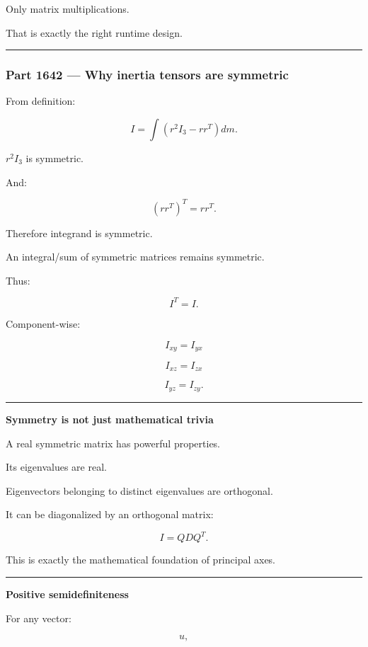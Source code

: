Only matrix multiplications.

That is exactly the right runtime design.

\begin{center}\rule{0.5\linewidth}{0.5pt}\end{center}

\subsubsection{Part 1642 --- Why inertia tensors are symmetric}\label{part-1642-why-inertia-tensors-are-symmetric}

From definition:

\[
I
=
\int
(
r^2I_3
-
rr^T
)
dm.
\]

\(r^2I_3\) is symmetric.

And:

\[
(rr^T)^T
=
rr^T.
\]

Therefore integrand is symmetric.

An integral/sum of symmetric matrices remains symmetric.

Thus:

\[
\boxed{
I^T=I.
}
\]

Component-wise:

\[
I_{xy}=I_{yx}
\]

\[
I_{xz}=I_{zx}
\]

\[
I_{yz}=I_{zy}.
\]

\begin{center}\rule{0.5\linewidth}{0.5pt}\end{center}

\textbf{Symmetry is not just mathematical trivia}

A real symmetric matrix has powerful properties.

Its eigenvalues are real.

Eigenvectors belonging to distinct eigenvalues are orthogonal.

It can be diagonalized by an orthogonal matrix:

\[
I=QDQ^T.
\]

This is exactly the mathematical foundation of principal axes.

\begin{center}\rule{0.5\linewidth}{0.5pt}\end{center}

\textbf{Positive semidefiniteness}

For any vector:

\[
u,
\]

